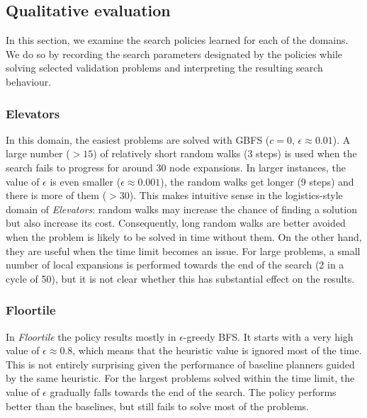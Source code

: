 \documentclass[letterpaper]{article} %
\begin{document}
\subsection{Qualitative evaluation}

In this section, we examine the search policies learned for each of the domains. We do so by recording the search parameters designated by the policies while solving selected validation problems and interpreting the resulting search behaviour.

\subsubsection{Elevators} In this domain, the easiest problems are solved with GBFS ($c=0$, $\epsilon \approx 0.01$). A large number ($>15$) of relatively short random walks (3 steps) is used when the search fails to progress for around $30$ node expansions. In larger instances, the value of $\epsilon$ is even smaller ($\epsilon \approx 0.001$), the random walks get longer (9 steps) and there is more of them ($>30$). This makes intuitive sense in the logistics-style domain of \emph{Elevators}: random walks may increase the chance of finding a solution but also increase its cost. Consequently, long random walks are better avoided when the problem is likely to be solved in time without them. On the other hand, they are useful when the time limit becomes an issue. For large problems, a small number of local expansions is performed towards the end of the search (2 in a cycle of 50), but it is not clear whether this has substantial effect on the results.

\subsubsection{Floortile} In \emph{Floortile} the policy results mostly in $\epsilon$-greedy BFS. It starts with a very high value of $\epsilon \approx 0.8$, which means that the heuristic value is ignored most of the time. This is not entirely surprising given the performance of baseline planners guided by the same heuristic. For the largest problems solved within the time limit, the value of $\epsilon$ gradually falls towards the end of the search. The policy performs better than the baselines, but still fails to solve most of the problems.
\end{document}
